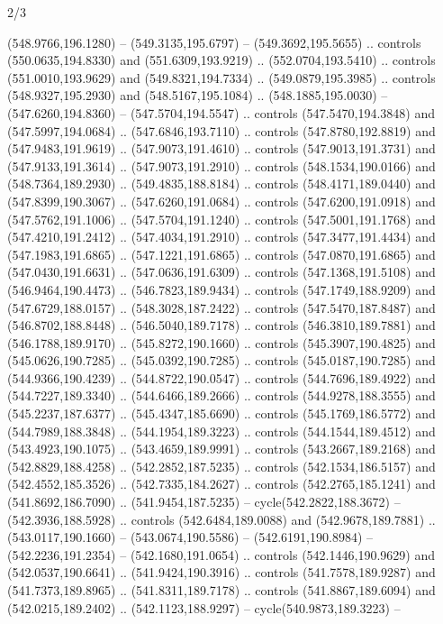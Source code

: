 \begin{flagdescription}{2/3}
\begin{scope}[xshift=0.5\flaglength,yshift=0.5\flagwidth,scale=\flagwidth/495.65]
\begin{scope}[y=0.8pt, x=0.8pt, yscale=-1,shift={(-463.76,-309.78)}]
  (548.9766,196.1280) -- (549.3135,195.6797) -- (549.3692,195.5655) .. controls
  (550.0635,194.8330) and (551.6309,193.9219) .. (552.0704,193.5410) .. controls
  (551.0010,193.9629) and (549.8321,194.7334) .. (549.0879,195.3985) .. controls
  (548.9327,195.2930) and (548.5167,195.1084) .. (548.1885,195.0030) --
  (547.6260,194.8360) -- (547.5704,194.5547) .. controls (547.5470,194.3848) and
  (547.5997,194.0684) .. (547.6846,193.7110) .. controls (547.8780,192.8819) and
  (547.9483,191.9619) .. (547.9073,191.4610) .. controls (547.9013,191.3731) and
  (547.9133,191.3614) .. (547.9073,191.2910) .. controls (548.1534,190.0166) and
  (548.7364,189.2930) .. (549.4835,188.8184) .. controls (548.4171,189.0440) and
  (547.8399,190.3067) .. (547.6260,191.0684) .. controls (547.6200,191.0918) and
  (547.5762,191.1006) .. (547.5704,191.1240) .. controls (547.5001,191.1768) and
  (547.4210,191.2412) .. (547.4034,191.2910) .. controls (547.3477,191.4434) and
  (547.1983,191.6865) .. (547.1221,191.6865) .. controls (547.0870,191.6865) and
  (547.0430,191.6631) .. (547.0636,191.6309) .. controls (547.1368,191.5108) and
  (546.9464,190.4473) .. (546.7823,189.9434) .. controls (547.1749,188.9209) and
  (547.6729,188.0157) .. (548.3028,187.2422) .. controls (547.5470,187.8487) and
  (546.8702,188.8448) .. (546.5040,189.7178) .. controls (546.3810,189.7881) and
  (546.1788,189.9170) .. (545.8272,190.1660) .. controls (545.3907,190.4825) and
  (545.0626,190.7285) .. (545.0392,190.7285) .. controls (545.0187,190.7285) and
  (544.9366,190.4239) .. (544.8722,190.0547) .. controls (544.7696,189.4922) and
  (544.7227,189.3340) .. (544.6466,189.2666) .. controls (544.9278,188.3555) and
  (545.2237,187.6377) .. (545.4347,185.6690) .. controls (545.1769,186.5772) and
  (544.7989,188.3848) .. (544.1954,189.3223) .. controls (544.1544,189.4512) and
  (543.4923,190.1075) .. (543.4659,189.9991) .. controls (543.2667,189.2168) and
  (542.8829,188.4258) .. (542.2852,187.5235) .. controls (542.1534,186.5157) and
  (542.4552,185.3526) .. (542.7335,184.2627) .. controls (542.2765,185.1241) and
  (541.8692,186.7090) .. (541.9454,187.5235) -- cycle(542.2822,188.3672) --
  (542.3936,188.5928) .. controls (542.6484,189.0088) and (542.9678,189.7881) ..
  (543.0117,190.1660) -- (543.0674,190.5586) -- (542.6191,190.8984) --
  (542.2236,191.2354) -- (542.1680,191.0654) .. controls (542.1446,190.9629) and
  (542.0537,190.6641) .. (541.9424,190.3916) .. controls (541.7578,189.9287) and
  (541.7373,189.8965) .. (541.8311,189.7178) .. controls (541.8867,189.6094) and
  (542.0215,189.2402) .. (542.1123,188.9297) -- cycle(540.9873,189.3223) --

\end{scope}
\end{scope}
\end{flagdescription}
